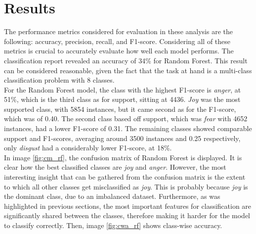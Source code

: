 \chapter*{Results}
\label{ch:results}
The performance metrics considered for evaluation in these analysis are the
following: accuracy, precision, recall, and F1-score. Considering all of these
metrics is crucial to accurately evaluate how well each model performs.
The classification
report revealed an accuracy of 34\% for Random Forest.
This result can be considered reasonable, given the fact that the task at hand
is a multi-class classification problem with 8 classes.\\

For the Random Forest model, the class with the highest F1-score is \textit{anger}, at 51\%,
which is the third class as for support, sitting at 4436. 
\textit{Joy} was the most supported class, with 5854 instances, but it came second
as for the F1-score, which was of 0.40. The second class based off support, which
was \textit{fear} with 4652 instances, had a lower F1-score of 0.31. 
The remaining classes showed comparable support and F1-scores, averaging around
3500 instances and 0.25 respectively, only \textit{disgust} had a considerably
lower F1-score, at 18\%. \\
In image \ref{fig:cm_rf}, the confusion matrix of Random Forest is displayed.
It is clear how the best classified classes are
\textit{joy} and \textit{anger}. However, the most interesting insight that can
be gathered from the confusion matrix is the extent to which all other classes
get misclassified as \textit{joy}. This is probably because \textit{joy} is the
dominant class, due to an imbalanced dataset.
Furthermore, as was highlighted in previous sections, the most important
features for classification are significantly shared between the classes,
therefore making it harder for the model to classify correctly.
Then, image \ref{fig:cwa_rf} shows class-wise accuracy.\\
